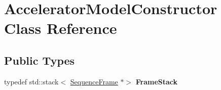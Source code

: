 \hypertarget{classAcceleratorModelConstructor}{}\section{Accelerator\+Model\+Constructor Class Reference}
\label{classAcceleratorModelConstructor}
\subsection*{Public Types}
\begin{DoxyCompactItemize}
\item 
\mbox{\label{classAcceleratorModelConstructor_a95137acaeede54d6f7bcaf696a627d60}} 
typedef std\+::stack$<$ \hyperlink{classSequenceFrame}{Sequence\+Frame} $\ast$$>$ {\bfseries Frame\+Stack}
\end{DoxyCompactItemize}
